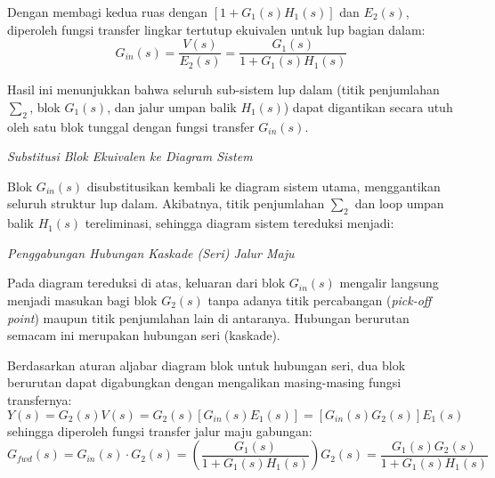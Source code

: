 \documentclass[11pt,a4paper]{article}
\begin{document}
Dengan membagi kedua ruas dengan $[1 + G_1(s) H_1(s)]$ dan $E_2(s)$, diperoleh fungsi transfer lingkar tertutup ekuivalen untuk lup bagian dalam:
$$G_{in}(s) = \frac{V(s)}{E_2(s)} = \frac{G_1(s)}{1 + G_1(s) H_1(s)}$$

Hasil ini menunjukkan bahwa seluruh sub-sistem lup dalam (titik penjumlahan $\sum_2$, blok $G_1(s)$, dan jalur umpan balik $H_1(s)$) dapat digantikan secara utuh oleh satu blok tunggal dengan fungsi transfer $G_{in}(s)$.

\textit{Substitusi Blok Ekuivalen ke Diagram Sistem}

Blok $G_{in}(s)$ disubstitusikan kembali ke diagram sistem utama, menggantikan seluruh struktur lup dalam. Akibatnya, titik penjumlahan $\sum_2$ dan loop umpan balik $H_1(s)$ tereliminasi, sehingga diagram sistem tereduksi menjadi:

\begin{center}
\end{center}

\textit{Penggabungan Hubungan Kaskade (Seri) Jalur Maju}

Pada diagram tereduksi di atas, keluaran dari blok $G_{in}(s)$ mengalir langsung menjadi masukan bagi blok $G_2(s)$ tanpa adanya titik percabangan (\textit{pick-off point}) maupun titik penjumlahan lain di antaranya. Hubungan berurutan semacam ini merupakan hubungan seri (kaskade).

Berdasarkan aturan aljabar diagram blok untuk hubungan seri, dua blok berurutan dapat digabungkan dengan mengalikan masing-masing fungsi transfernya:
$$Y(s) = G_2(s) V(s) = G_2(s) \left[ G_{in}(s) E_1(s) \right] = \left[ G_{in}(s) G_2(s) \right] E_1(s)$$
sehingga diperoleh fungsi transfer jalur maju gabungan:
$$G_{fwd}(s) = G_{in}(s) \cdot G_2(s) = \left( \frac{G_1(s)}{1 + G_1(s) H_1(s)} \right) G_2(s) = \frac{G_1(s) G_2(s)}{1 + G_1(s) H_1(s)}$$
\end{document}
